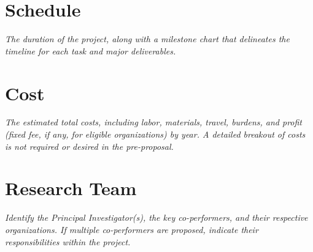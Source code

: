 \documentclass[11pt,letterpaper,english,bibliography=totocnumbered, abstract=on]{scrartcl}
\begin{document}
\section{Schedule}
\textit{The duration of the project, along with a milestone chart that delineates the
timeline for each task and major deliverables.}

\section{Cost}

\textit{The estimated total costs, including labor, materials, travel, burdens, and profit
(fixed fee, if any, for eligible organizations) by year. A detailed breakout of costs is not
required or desired in the pre-proposal.}

\section{Research Team}

\textit{Identify the Principal Investigator(s), the key co-performers, and
their respective organizations. If multiple co-performers are proposed, indicate their
responsibilities within the project.}
\end{document}
